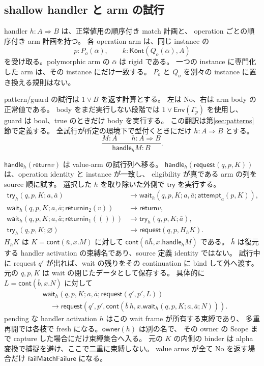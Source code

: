 \documentclass[11pt,a4paper]{article}
\newcommand{\Ret}{\mathsf{return}}
\newcommand{\Req}{\mathsf{request}}
\newcommand{\Fail}{\mathsf{fail}}
\newcommand{\Handle}{\mathsf{handle}}
\begin{document}
\subsection{shallow handler と arm の試行}

handler \(h:A\Rightarrow B\) は、正常値用の順序付き match 計画と、
operation ごとの順序付き arm 計画を持つ。
各 operation arm は、同じ instance の
\[
 p:P_o(\bar\alpha),\qquad k:\mathsf{Kont}(Q_o(\bar\alpha),A)
\]
を受け取る。polymorphic arm の \(\bar\alpha\) は rigid である。
一つの instance に専門化した arm は、その instance にだけ一致する。
\(P_o\) と \(Q_o\) を別々の instance に置き換える規則はない。

pattern/guard の試行は \(1\vee B\) を返す計算とする。
左は No、右は arm body の正常値である。
body をまだ実行しない段階では \(1\vee\mathsf{Env}(\Gamma_p)\) を使用し、
guard は bool、true のときだけ body を実行する。
この翻訳は第\ref{sec:patterns}節で定義する。
全試行が所定の環境下で型付くときにだけ \(h:A\Rightarrow B\) とする。
\[
 \frac{M:A\qquad h:A\Rightarrow B}{\Handle_h M:B}.
\]

\(\Handle_h(\Ret v)\) は value-arm の試行列へ移る。
\(\Handle_h(\Req(q,p,K))\) は、operation identity と instance が一致し、
eligibility が真である arm の列を source 順に試す。
選択した \(h\) を取り除いた外側で \(\mathsf{try}\) を実行する。
\begin{align*}
 \mathsf{try}_h(q,p,K;a,\bar a)
 &\longrightarrow\mathsf{wait}_h(q,p,K;a,\bar a;\mathsf{attempt}_a(p,K)),\\
 \mathsf{wait}_h(q,p,K;a,\bar a;\Ret\mathsf{in}_2(v))
 &\longrightarrow\Ret v,\\
 \mathsf{wait}_h(q,p,K;a,\bar a;\Ret\mathsf{in}_1(()))
 &\longrightarrow\mathsf{try}_h(q,p,K;\bar a),\\
 \mathsf{try}_h(q,p,K;\varnothing)
 &\longrightarrow\Req(q,p,H_hK).
\end{align*}
\(H_hK\) は \(K=\mathsf{cont}(\bar u,x.M)\) に対して
\(\mathsf{cont}(\bar u\bar h,x.\Handle_h M)\) である。
\(\bar h\) は復元する handler activation の束縛名であり、source 定義 identity ではない。
試行中に request \(q'\) が出れば、wait の残りをその continuation に bind して外へ渡す。
元の \(q,p,K\) は wait の閉じたデータとして保存する。
具体的に \(L=\mathsf{cont}(\bar b,x.N)\) に対して
\[
\begin{split}
 &\mathsf{wait}_h(q,p,K;a,\bar a;\Req(q',p',L))\\
 &\quad\longrightarrow\Req(q',p',\mathsf{cont}(\bar b\,h,x.
       \mathsf{wait}_h(q,p,K;a,\bar a;N))).
\end{split}
\]
pending な handler activation \(h\) はこの wait frame が所有する束縛であり、
多重再開では各枝で fresh になる。\(\mathsf{owner}(h)\) は別の名で、
その owner の Scope まで capture した場合にだけ束縛集合へ入る。
元の \(K\) の内側の binder は alpha 変換で捕捉を避け、ここで二重に束縛しない。
value arms が全て No を返す場合だけ \(\Fail\mathsf{MatchFailure}\) になる。
\end{document}
